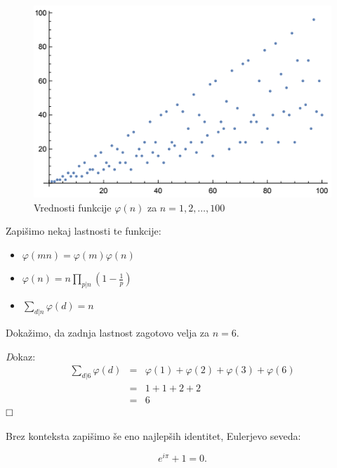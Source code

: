 \documentclass[a4paper,12pt]{article}
\def\qed{$\hfill\Box$}   %
\begin{document}
\begin{figure}[h!]
\includegraphics{eulerjeva.PNG}
\caption{Vrednosti funkcije $\varphi(n)$ za $n = 1,2,\ldots,100$}\label{fi100}
\end{figure}

\newpage
Zapišimo nekaj lastnosti te funkcije:
\begin{itemize}
\item $\varphi (mn)=\varphi (m)\varphi (n)$
\item $\varphi (n)=n \prod_{p|n}(1-\frac{1}{p})$
\item $\sum_{d|n}\varphi(d)=n$
\end{itemize}

Dokažimo, da zadnja lastnost zagotovo velja za $n=6$.

{\emph Dokaz:}
\begin{eqnarray*}
\sum_{d|6}\varphi(d) &=& \varphi(1) + \varphi(2)+\varphi(3) + \varphi(6) \\
&=& 1 + 1+2+2 \\
&=& 6
\end{eqnarray*} \qed

Brez konteksta zapišimo še eno najlepših identitet, Eulerjevo seveda:

$$e^{i\pi}+1=0.$$
\end{document}
